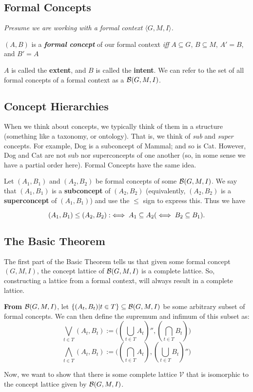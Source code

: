 \subsection{Formal Concepts}
\label{subsec:Introduction-Formal_Concepts}

\textit{Presume we are working with a formal context $\langle G, M, I \rangle$.}
\begin{definition}
    
    $(A,B)$ is a \textit{\textbf{formal concept}} of our formal context \textit{iff}    $A \subseteq G$, $B \subseteq M$, $A' = B$, and $B' = A$ 
\end{definition}

$A$ is called the \textbf{extent}, and $B$ is called the \textbf{intent}. We can refer to the set of all formal concepts of a formal context as a $\mathcal{B} (G, M, I)$.

\subsection{Concept Hierarchies}
\label{subsec:Introduction-Concept_Hierarchies}

When we think about concepts, we typically think of them in a structure (something like a taxonomy, or ontology). That is, we think of \textit{sub} and \textit{super} concepts. For example, Dog is a subconcept of Mammal; and so is Cat. However, Dog and Cat are not sub nor superconcepts of one another (so, in some sense we have a partial order here). Formal Concepts have the same idea. 

\begin{definition}
    Let $(A_1, B_1)$ and $(A_2, B_2)$ be formal concepts of some $\mathcal{B}(G,M,I)$. We say that $(A_1,B_1)$ is a \textbf{subconcept} of $(A_2,B_2)$ (equivalently, $(A_2,B_2)$ is a \textbf{superconcept} of $(A_1, B_1)$) and use the $\leq$ sign to express this. Thus we have 
    
    \[(A_1, B_1)\leq (A_2, B_2) :\iff A_1 \subseteq A_2 \space (\iff B_2 \subseteq B_1).\]
\end{definition}

\subsection{The Basic Theorem}
\label{subsec:Introduction-The_Basic_Theorem}
The first part of the Basic Theorem tells us that given some formal concept $(G,M,I)$, the concept lattice of $\mathcal{B}(G,M,I)$ is a complete lattice. So, constructing a lattice from a formal context, will always result in a complete lattice. 

\textbf{From $\mathcal{B}(G,M,I)$}, let $\{(A_t, B_t) | t\in T\} \subseteq \mathcal{B} (G,M,I)$ be some arbitrary subset of formal concepts. We can then define the supremum and infimum of this subset as: 
\[ \bigvee_{t\in T} (A_t, B_t) := \Big( (\bigcup_{t\in T} A_t)'', (\bigcap_{t\in T}B_t) \Big)\] 
\[ \bigwedge_{t\in T} (A_t, B_t) := \Big( (\bigcap_{t\in T} A_t), (\bigcup_{t\in T}B_t)'' \Big)\] 

Now, we want to show that there is some complete lattice $\mathcal{V}$ that is isomorphic to the concept lattice given by $\mathcal{B}(G,M,I)$. 